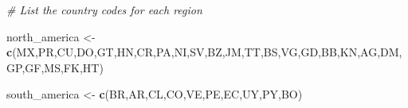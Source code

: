 \documentclass[
]{article}
\newenvironment{Shaded}{\begin{snugshade}}{\end{snugshade}}
\newcommand{\CommentTok}[1]{\textcolor[rgb]{0.56,0.35,0.01}{\textit{#1}}}
\newcommand{\FunctionTok}[1]{\textcolor[rgb]{0.13,0.29,0.53}{\textbf{#1}}}
\newcommand{\NormalTok}[1]{#1}
\newcommand{\OtherTok}[1]{\textcolor[rgb]{0.56,0.35,0.01}{#1}}
\newcommand{\StringTok}[1]{\textcolor[rgb]{0.31,0.60,0.02}{#1}}
\begin{document}
\begin{Shaded}
\begin{Highlighting}[]
\CommentTok{\# List the country codes for each region}

\NormalTok{north\_america }\OtherTok{\textless{}{-}} \FunctionTok{c}\NormalTok{(}\StringTok{\textquotesingle{}MX\textquotesingle{}}\NormalTok{,}\StringTok{\textquotesingle{}PR\textquotesingle{}}\NormalTok{,}\StringTok{\textquotesingle{}CU\textquotesingle{}}\NormalTok{,}\StringTok{\textquotesingle{}DO\textquotesingle{}}\NormalTok{,}\StringTok{\textquotesingle{}GT\textquotesingle{}}\NormalTok{,}\StringTok{\textquotesingle{}HN\textquotesingle{}}\NormalTok{,}\StringTok{\textquotesingle{}CR\textquotesingle{}}\NormalTok{,}\StringTok{\textquotesingle{}PA\textquotesingle{}}\NormalTok{,}\StringTok{\textquotesingle{}NI\textquotesingle{}}\NormalTok{,}\StringTok{\textquotesingle{}SV\textquotesingle{}}\NormalTok{,}\StringTok{\textquotesingle{}BZ\textquotesingle{}}\NormalTok{,}\StringTok{\textquotesingle{}JM\textquotesingle{}}\NormalTok{,}\StringTok{\textquotesingle{}TT\textquotesingle{}}\NormalTok{,}\StringTok{\textquotesingle{}BS\textquotesingle{}}\NormalTok{,}\StringTok{\textquotesingle{}VG\textquotesingle{}}\NormalTok{,}\StringTok{\textquotesingle{}GD\textquotesingle{}}\NormalTok{,}\StringTok{\textquotesingle{}BB\textquotesingle{}}\NormalTok{,}\StringTok{\textquotesingle{}KN\textquotesingle{}}\NormalTok{,}\StringTok{\textquotesingle{}AG\textquotesingle{}}\NormalTok{,}\StringTok{\textquotesingle{}DM\textquotesingle{}}\NormalTok{,}\StringTok{\textquotesingle{}GP\textquotesingle{}}\NormalTok{,}\StringTok{\textquotesingle{}GF\textquotesingle{}}\NormalTok{,}\StringTok{\textquotesingle{}MS\textquotesingle{}}\NormalTok{,}\StringTok{\textquotesingle{}FK\textquotesingle{}}\NormalTok{,}\StringTok{\textquotesingle{}HT\textquotesingle{}}\NormalTok{)}

\NormalTok{south\_america }\OtherTok{\textless{}{-}} \FunctionTok{c}\NormalTok{(}\StringTok{\textquotesingle{}BR\textquotesingle{}}\NormalTok{,}\StringTok{\textquotesingle{}AR\textquotesingle{}}\NormalTok{,}\StringTok{\textquotesingle{}CL\textquotesingle{}}\NormalTok{,}\StringTok{\textquotesingle{}CO\textquotesingle{}}\NormalTok{,}\StringTok{\textquotesingle{}VE\textquotesingle{}}\NormalTok{,}\StringTok{\textquotesingle{}PE\textquotesingle{}}\NormalTok{,}\StringTok{\textquotesingle{}EC\textquotesingle{}}\NormalTok{,}\StringTok{\textquotesingle{}UY\textquotesingle{}}\NormalTok{,}\StringTok{\textquotesingle{}PY\textquotesingle{}}\NormalTok{,}\StringTok{\textquotesingle{}BO\textquotesingle{}}\NormalTok{)}



\end{Highlighting}
\end{Shaded}
\end{document}
